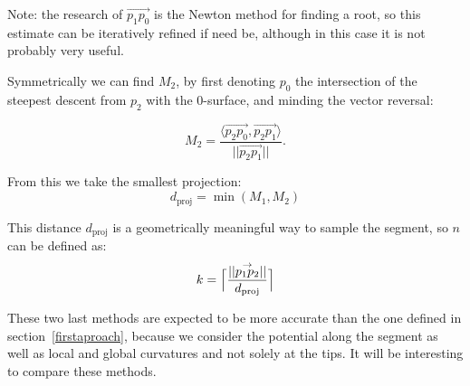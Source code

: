 \documentclass[11pt,a4paper]{article}
\newcommand{\gvec}[1]{\ensuremath{\overset{\rightarrow}{#1}}}
\newcommand{\scal}[2]{\ensuremath{\langle #1 , #2 \rangle}}
\begin{document}
Note: the research of $\gvec{p_1p_0}$ is the Newton method for finding a root, so this estimate can be iteratively refined if need be, although in this case it is not probably very useful. 
%
%
%

Symmetrically we can find $M_2$, by first denoting $p_0$ the intersection of the steepest descent from $p_2$ with the 0-surface, and minding the vector reversal: 

%
\begin{equation}
M_2 =  \frac{\scal{\gvec{p_2p_0}}{\gvec{p_2p_1}}}{||\gvec{p_2p_1}||}.
\end{equation}

From this we take the smallest projection:
\begin{equation}
d_{\text{proj}} = \min(M_1,M_2)
\end{equation}

This distance $d_{\text{proj}}$ is a geometrically meaningful way to sample the segment, so $n$ can be defined as:
\begin{equation}
k = \Bigl\lceil\frac{||\gvec{p_1p_2}||}{d_{\text{proj}}}\Bigr\rceil
\end{equation}

These two last methods are expected to be more accurate than the one defined in section~\ref{firstaproach}, because we consider the potential along the segment as well as local and global curvatures and not solely at the tips. It will be interesting to compare these methods.
\end{document}
